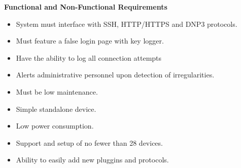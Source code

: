 \Large{\color{Blue}\textbf{Functional and Non-Functional Requirements}}
\begin{multicols}{2}
\begin{itemize}
    \item System must interface with SSH, HTTP/HTTPS and DNP3 protocols.
    \item Must feature a false login page with key logger.
    \item Have the ability to log all connection attempts  
    \item Alerts administrative personnel upon detection of irregularities.
    \newline
    \newline
    
    \item Must be low maintenance.
    \item Simple standalone device.
    \item Low power consumption.
    \item Support and setup of no fewer than 28 devices.
    \item Ability to easily add new pluggins and protocols.
\end{itemize}
\end{multicols}